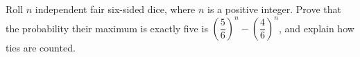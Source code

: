 Roll $ n $ independent fair six-sided dice, where $ n $ is a positive integer. Prove that the probability their maximum is exactly five is $\left(\dfrac{5}{6}\right)^n-\left(\dfrac{4}{6}\right)^n $, and explain how ties are counted.
